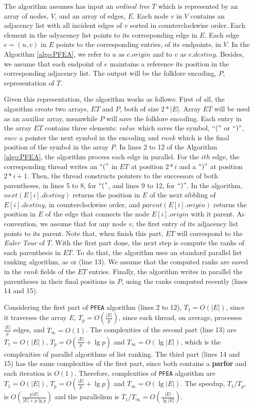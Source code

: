 The algorithm assumes has input an \emph{ordinal tree} $T$ which is represented by an array of nodes, $V$, and an array of edges, $E$. Each node $v$ in $V$ contains an adjacency list with all incident edges of $v$ sorted in counterclockwise order. Each element in the adyacency list points to its corresponding edge in $E$. Each edge $e=(u,v)$ in $E$ points to the corresponding entries, of its endpoints, in $V$. In the Algorithm \ref{algo:PFEA}, we refer to $u$ as $e.origin$ and to $v$ as $e.destiny$. Besides, we assume that each endpoint of $e$ maintains a reference its position in the corresponding adjacency list. The output will be the folklore encoding, $P$, representation of $T$.

Given this representation, the algorithm works as follows: 
First of all, the algorithm create two arrays, $ET$ and $P$, both of size $2*|E|$. Array $ET$ will be used as an auxiliar array, meanwhile $P$ will save the folklore encoding. Each entry in the array $ET$ contains three elements: $value$ which saves the symbol, $``("$ or $``)"$, $succ$ a pointer the next symbol in the encoding and $rank$ which is the final position of the symbol in the array $P$. In lines 2 to 12 of the Algorithm \ref{algo:PFEA}, the algorithm process each edge in parallel. For the $ith$ edge, the corresponding thread writes an $``("$ in $ET$ at position $2*i$ and a $``)"$ at position $2*i+1$. Then, the thread constructs pointers to the successors of both parentheses, in lines 5 to 8, for $``("$, and lines 9 to 12, for $``)"$. In the algorithm, $next(E[i].destiny)$ returns the position in $E$ of the next sibbling of $E[i].destiny$, in counterclockwise order, and $parent(E[i].origin)$ returns the position in $E$ of the edge that connects the node $E[i].origin$ with it parent. As convention, we assume that for any node $v$, the first entry of its adjacency list points to its parent. Note that, when finish this part, $ET$ will correspond to the \emph{Euler Tour} of $T$.
With the first part done, the next step is compute the ranks of each parenthesis in $ET$. To do that, the algorithm uses an standard parallel list ranking algorithm, as \cite{Helman2001265} or \cite{Reif1993} (line 13). We assume that the computed ranks are saved in the $rank$ fields of the $ET$ entries. Finally, the algorithm writes in parallel the parentheses in their final positions in $P$, using the ranks computed recently (lines 14 and 15).

Considering the first part of {\tt PFEA} algorithm (lines 2 to 12), $T_1 = O(|E|)$, since it traverses the array $E$, $T_p = O(\frac{|E|}{p})$, since each thread, on average, processes $\frac{|E|}{p}$ edges, and $T_{\infty} = O(1)$. The complexities of the second part (line 13) are $T_1=O(|E|)$, $T_p=O(\frac{|E|}{p}+\lg p)$ and $T_{\infty}=O(\lg |E|)$, which is the complexities of parallel algorithms of list ranking. The third part (lines 14 and 15) has the same complexities of the first part, since both contains a {\bf parfor} and each iteration is $O(1)$. Therefore, complexities of {\tt PFEA} algorithm are
$T_1=O(|E|)$, $T_p=O(\frac{|E|}{p}+\lg p)$ and $T_{\infty}=O(\lg |E|)$. The speedup, $T_1/T_p$, is $O(\frac{p|E|}{|E|+p\lg p})$ and the parallelism is $T_1/T_{\infty} = O(\frac{|E|}{\lg |E|})$.

